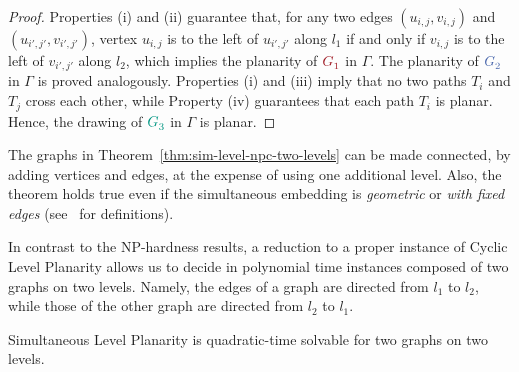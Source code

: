 \documentclass{llncs}
\newcommand{\red}[1]{{\color{red}{#1\xspace}}}
\newcommand{\blue}[1]{{\color{blue}{#1\xspace}}}
\newcommand{\green}[1]{{\color{green}{#1\xspace}}}
\newcommand{\Gr}[1]{$\red{G^{#1}_1}$\xspace}
\newcommand{\Gb}[1]{$\blue{G^{#1}_2}$\xspace}
\newcommand{\Gg}[1]{$\green{G^{#1}_3}$\xspace}
\begin{document}
\begin{proof}
Properties (i) and (ii) guarantee that, for any two edges $(u_{i,j},v_{i,j})$ and $(u_{i',j'},v_{i',j'})$, vertex $u_{i,j}$ is to the left of $u_{i',j'}$ along $l_1$ if and only if $v_{i,j}$ is to the left of $v_{i',j'}$ along $l_2$, which implies the planarity of \Gr{} in $\Gamma$. The planarity of \Gb{} in $\Gamma$ is proved analogously. Properties (i) and (iii) imply that no two paths $T_i$ and $T_j$ cross each other, while Property (iv) guarantees that each path $T_i$ is planar. Hence, the drawing of \Gg{} in $\Gamma$ is planar.
\end{proof}

The graphs in Theorem~\ref{thm:sim-level-npc-two-levels} can be made connected, by adding vertices and edges, at the expense of using one additional level. Also, the theorem holds true even if the simultaneous embedding is {\em geometric} or {\em with fixed edges} (see~\cite{bkr-sepg-13,bcdeeiklm-spge-07} for definitions).

In contrast to the NP-hardness results, a reduction to a proper instance of {\sc Cyclic Level Planarity} allows us to decide in polynomial time instances composed of two graphs on two levels. Namely, the edges of a graph are directed from $l_1$ to $l_2$, while those of the other graph are directed from $l_2$ to $l_1$.

\begin{theorem} \label{th:sim-poly}
{\sc Simultaneous Level Planarity} is quadratic-time solvable for two graphs on two levels. 
\end{theorem}
\end{document}
